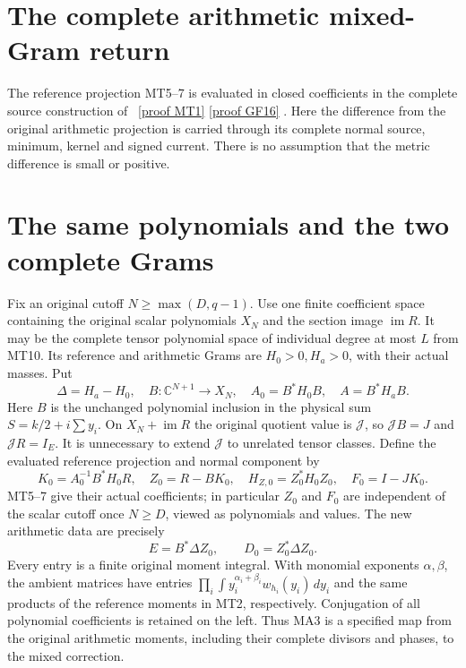\documentclass[11pt]{article}
\newcommand{\C}{\mathbb C}\newcommand{\R}{\mathbb R}
\newcommand{\im}{\operatorname{im}}
\begin{document}
\clearpage
\section*{The complete arithmetic mixed-Gram return}

The reference projection MT5--7 is evaluated in closed coefficients
in the complete source construction of \cite{MAMT,MAGF}%
~\href{https://github.com/KokunoYumeto/zeta-function-research-reader/blob/main/workbenches/splitzero-tandem/continuations/20260921-kernel-degree-steps/providers/OBSERVATION_COMPLETE_PROOFS.tex\#L1629}{[proof MT1]} \href{https://github.com/KokunoYumeto/zeta-function-research-reader/blob/main/workbenches/splitzero-tandem/continuations/20260921-kernel-degree-steps/providers/OBSERVATION_COMPLETE_PROOFS.tex\#L1383}{[proof GF16]}%
{}.
Here the difference from the original arithmetic projection is carried
through its complete normal source, minimum, kernel and signed current.
There is no assumption that the metric difference is small or positive.

\section{The same polynomials and the two complete Grams}
Fix an original cutoff $N\ge\max(D,q-1)$. Use one finite coefficient
space containing the original scalar polynomials $X_N$ and the section
image $\im R$. It may be the complete tensor polynomial space of
individual degree at most $L$ from MT10. Its reference and arithmetic
Grams are $H_0>0,H_a>0$, with their actual masses. Put
\[
 \Delta=H_a-H_0,\quad B:\C^{N+1}\longrightarrow X_N,
 \quad A_0=B^*H_0B,\quad A=B^*H_aB.
 \tag{MA1}
\]
Here $B$ is the unchanged polynomial inclusion in the physical sum
$S=k/2+i\sum y_i$. On $X_N+\im R$ the original quotient value is
$\mathcal J$, so $\mathcal JB=J$ and $\mathcal JR=I_E$.
It is unnecessary to extend $\mathcal J$ to unrelated tensor classes.
Define the evaluated reference projection and normal component by
\[
 K_0=A_0^{-1}B^*H_0R,\quad Z_0=R-BK_0,\quad
 H_{Z,0}=Z_0^*H_0Z_0,\quad F_0=I-JK_0.
 \tag{MA2}
\]
MT5--7 give their actual coefficients; in particular $Z_0$ and $F_0$
are independent of the scalar cutoff once $N\ge D$, viewed as
polynomials and values. The new arithmetic data are precisely
\[
 E=B^*\Delta Z_0,\qquad D_0=Z_0^*\Delta Z_0.
 \tag{MA3}
\]
Every entry is a finite original moment integral. With monomial
exponents $\alpha,\beta$, the ambient matrices have entries
$\prod_i\int y_i^{\alpha_i+\beta_i}w_{h_i}(y_i)\,dy_i$
and the same products of the reference moments in MT2, respectively.
Conjugation of all polynomial coefficients is retained on the left.
Thus MA3 is a specified map from the original arithmetic moments,
including their complete divisors and phases, to the mixed correction.
\end{document}
